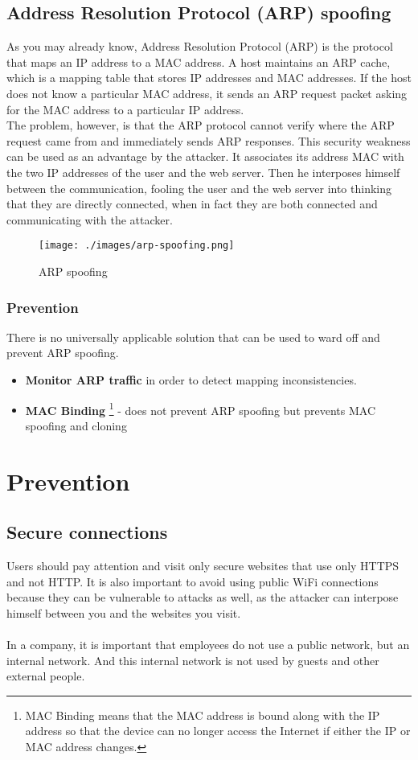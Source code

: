 \subsection{Address Resolution Protocol (ARP) spoofing}
As you may already know, Address Resolution Protocol (ARP) is the protocol that maps an IP address to a MAC address.
A host maintains an ARP cache, which is a mapping table that stores IP addresses and MAC addresses. If the host does not know a particular MAC address, it sends an ARP request packet asking for the MAC address to a particular IP address. \\
The problem, however, is that the ARP protocol cannot verify where the ARP request came from and immediately sends ARP responses. 
This security weakness can be used as an advantage by the attacker.
It associates its address MAC with the two IP addresses of the user and the web server.
Then he interposes himself between the communication, fooling the user and the web server into thinking that they are directly connected, when in fact they are both connected and communicating with the attacker.

\begin{figure}[H]
    \centering
    \texttt{[image: ./images/arp-spoofing.png]}
    \caption{ARP spoofing} 
\end{figure}

\subsubsection{Prevention}
There is no universally applicable solution that can be used to ward off and prevent ARP spoofing.
\begin{itemize}
    \item \textbf{Monitor ARP traffic} in order to detect mapping inconsistencies.
    \item \textbf{MAC Binding} \footnote{MAC Binding means that the MAC address is bound along with the IP address so that the device can no longer access the Internet if either the IP or MAC address changes.} - does not prevent ARP spoofing but prevents MAC spoofing and cloning
\end{itemize}

\newpage
\section{Prevention}
\subsection{Secure connections}
Users should pay attention and visit only secure websites that use only HTTPS and not HTTP.
It is also important to avoid using public WiFi connections because they can be vulnerable to attacks as well, as the attacker can interpose himself between you and the websites you visit. \\
\\In a company, it is important that employees do not use a public network, but an internal network. And this internal network is not used by guests and other external people.

